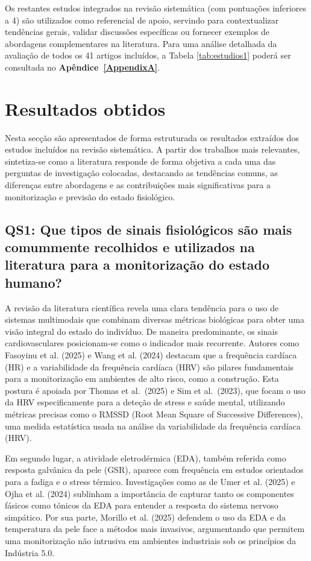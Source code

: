 Os restantes estudos integrados na revisão sistemática (com pontuações inferiores a 4) são utilizados como referencial de apoio, servindo para contextualizar tendências gerais, validar discussões específicas ou fornecer exemplos de abordagens complementares na literatura. Para uma análise detalhada da avaliação de todos os 41 artigos incluídos, a Tabela \ref{tab:estudios1} poderá ser consultada no \textbf{Apêndice~\ref{AppendixA}}.

\section{Resultados obtidos}
\label{sec:resultados}

Nesta secção são apresentados de forma estruturada os resultados extraídos dos estudos incluídos na revisão sistemática. A partir dos trabalhos mais relevantes, sintetiza-se como a literatura responde de forma objetiva a cada uma das perguntas de investigação colocadas, destacando as tendências comuns, as diferenças entre abordagens e as contribuições mais significativas para a monitorização e previsão do estado fisiológico.

\subsection*{QS1: Que tipos de sinais fisiológicos são mais comummente recolhidos e utilizados na literatura para a monitorização do estado humano?}
\label{subsec:qs1}

A revisão da literatura científica revela uma clara tendência para o uso de sistemas multimodais que combinam diversas métricas biológicas para obter uma visão integral do estado do indivíduo. De maneira predominante, os sinais cardiovasculares posicionam-se como o indicador mais recorrente. Autores como Fasoyinu et al. (2025) e Wang et al. (2024) \cite{fasoyinu2025,wang2024} destacam que a frequência cardíaca (HR) e a variabilidade da frequência cardíaca (HRV) são pilares fundamentais para a monitorização em ambientes de alto risco, como a construção. Esta postura é apoiada por Thomas et al.~(2025) e Sim et al.~(2023)\cite{thomas2025,sim2023}, que focam o uso da HRV especificamente para a deteção de stress e saúde mental, utilizando métricas precisas como o RMSSD (Root Mean Square of Successive Differences), uma medida estatística usada na análise da variabilidade da frequência cardíaca (HRV).

Em segundo lugar, a atividade eletrodérmica (EDA), também referida como resposta galvânica da pele (GSR), aparece com frequência em estudos orientados para a fadiga e o stress térmico. Investigações como as de Umer et al. (2025) e Ojha et al. (2024) \cite{umer2025,ojha2024} sublinham a importância de capturar tanto os componentes fásicos como tónicos da EDA para entender a resposta do sistema nervoso simpático. Por sua parte, Morillo et al. (2025) \cite{albarran2025} defendem o uso da EDA e da temperatura da pele face a métodos mais invasivos, argumentando que permitem uma monitorização não intrusiva em ambientes industriais sob os princípios da Indústria 5.0.

